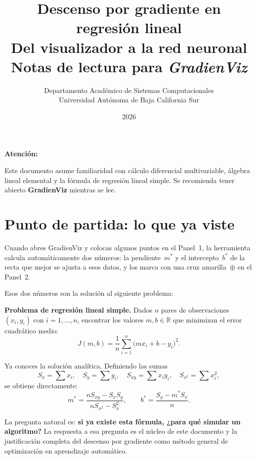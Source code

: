 \documentclass[12pt, a4paper]{article}
\title{
  {\Large\bfseries Descenso por gradiente en regresión lineal}\\[0.4em]
  {\large Del visualizador a la red neuronal}\\[0.8em]
  {\normalsize Notas de lectura para \textit{GradienViz}}
}
\author{
  Departamento Académico de Sistemas Computacionales\\
  Universidad Autónoma de Baja California Sur
}
\date{2026}
\newenvironment{vizadv}{%
  \begin{mdframed}[style=viznaranja]
  \textbf{\color{bordeadv}Atención:}\quad
}{%
  \end{mdframed}
}
\newenvironment{vizdef}{%
  \begin{mdframed}[style=vizazul]
}{%
  \end{mdframed}
}
\newcommand{\R}{\mathbb{R}}
\newcommand{\mstar}{m^{*}}
\newcommand{\bstar}{b^{*}}
\newcommand{\Jfun}{J(m,b)}
\begin{document}
\maketitle
\tableofcontents
\vspace{1em}

\begin{vizadv}
  Este documento asume familiaridad con cálculo diferencial multivariable,
  álgebra lineal elemental y la fórmula de regresión lineal simple.
  Se recomienda tener abierto \textbf{GradienViz} mientras se lee.
\end{vizadv}

\section{Punto de partida: lo que ya viste}

Cuando abres GradienViz y colocas algunos puntos en el Panel~1, la herramienta
calcula automáticamente dos números: la pendiente~$\mstar$ y el intercepto~$\bstar$
de la recta que mejor se ajusta a esos datos, y los marca con una cruz amarilla~$\oplus$
en el Panel~2.

Esos dos números son la solución al siguiente problema:

\begin{vizdef}
\textbf{Problema de regresión lineal simple.} Dados $n$ pares de observaciones
$(x_i, y_i)$ con $i = 1, \ldots, n$, encontrar los valores $m, b \in \R$ que
minimizan el error cuadrático medio:
\begin{equation}\label{eq:J}
  \Jfun = \frac{1}{n}\sum_{i=1}^{n}\bigl(m x_i + b - y_i\bigr)^2.
\end{equation}
\end{vizdef}

Ya conoces la solución analítica. Definiendo las sumas
\[
  S_x = \sum x_i, \quad
  S_y = \sum y_i, \quad
  S_{xy} = \sum x_i y_i, \quad
  S_{x^2} = \sum x_i^2,
\]
se obtiene directamente:
\begin{equation}\label{eq:exacta}
  \mstar = \frac{n S_{xy} - S_x S_y}{n S_{x^2} - S_x^2},
  \qquad
  \bstar = \frac{S_y - \mstar S_x}{n}.
\end{equation}

La pregunta natural es: \textbf{si ya existe esta fórmula, ¿para qué simular
un algoritmo?} La respuesta a esa pregunta es el núcleo de este documento
y la justificación completa del descenso por gradiente como método general
de optimización en aprendizaje automático.
\end{document}
